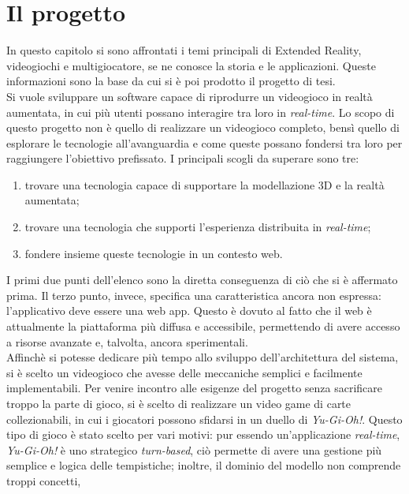     \section{Il progetto}
        In questo capitolo si sono affrontati i temi principali di Extended Reality, videogiochi e multigiocatore, se ne conosce la storia e le applicazioni. Queste informazioni
        sono la base da cui si è poi prodotto il progetto di tesi.\\
        \newline
        Si vuole sviluppare un software capace di riprodurre un videogioco in realtà aumentata, in cui più utenti possano interagire tra loro in \textit{real-time}. Lo scopo di questo
        progetto non è quello di realizzare un videogioco completo, bensì quello di esplorare le tecnologie all'avanguardia e come queste possano fondersi tra loro per raggiungere
        l'obiettivo prefissato. I principali scogli da superare sono tre:
        \begin{enumerate}
            \item trovare una tecnologia capace di supportare la modellazione 3D e la realtà aumentata;
            \item trovare una tecnologia che supporti l'esperienza distribuita in \textit{real-time};
            \item fondere insieme queste tecnologie in un contesto web.
        \end{enumerate}
        I primi due punti dell'elenco sono la diretta conseguenza di ciò che si è affermato prima. Il terzo punto, invece, specifica una caratteristica ancora non espressa: l'applicativo
        deve essere una web app. Questo è dovuto al fatto che il web è attualmente la piattaforma più diffusa e accessibile, permettendo di avere accesso a risorse avanzate e, talvolta,
        ancora sperimentali.\\
        \newline
        Affinchè si potesse dedicare più tempo allo sviluppo dell'architettura del sistema, si è scelto un videogioco che avesse delle meccaniche semplici e facilmente implementabili.
        Per venire incontro alle esigenze del progetto senza sacrificare troppo la parte di gioco, si è scelto di realizzare un video game di carte collezionabili, in cui i 
        giocatori possono sfidarsi in un duello di \textit{Yu-Gi-Oh!}. Questo tipo di gioco è stato scelto per vari motivi: pur essendo un'applicazione \textit{real-time}, \textit{Yu-Gi-Oh!}
        è uno strategico \textit{turn-based}, ciò permette di avere una gestione più semplice e logica delle tempistiche; inoltre, il dominio del modello non comprende troppi concetti,

